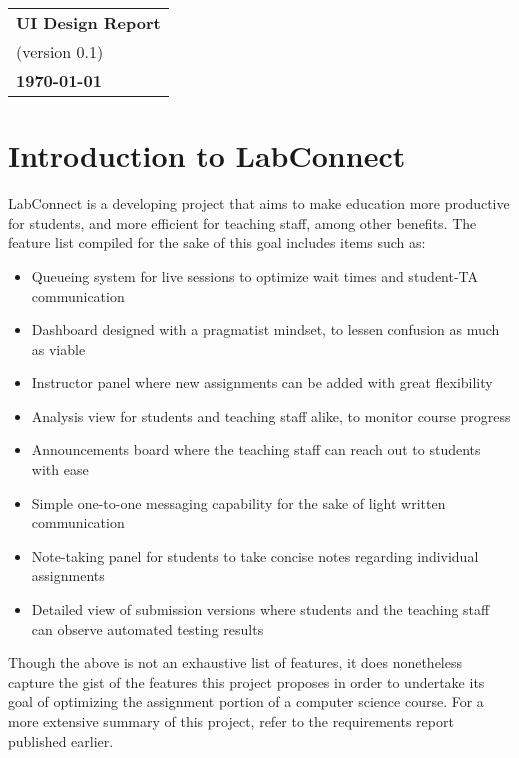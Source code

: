 \documentclass[a4paper, 12pt]{article}
\begin{document}
    \begin{table}[h!]
        \renewcommand{\arraystretch}{1.5}
        \centering
        \begin{tabular}{ |>{\centering\arraybackslash}m{15.15cm}| }
            \hline
            \Large \textbf{UI Design Report} \\
            \small (version 0.1) \\
            \small \textbf{\today} \\
            \hline
        \end{tabular}
    \end{table}
    
    
    \section{Introduction to LabConnect}
    
    LabConnect is a developing project that aims to make education more productive for students,
    and more efficient for teaching staff, among other benefits. The feature list compiled for the
    sake of this goal includes items such as:
    \begin{itemize}
        \item Queueing system for live sessions to optimize wait times and student-TA communication
        \item Dashboard designed with a pragmatist mindset, to lessen confusion as much as viable
        \item Instructor panel where new assignments can be added with great flexibility
        \item Analysis view for students and teaching staff alike, to monitor course progress
        \item Announcements board where the teaching staff can reach out to students with ease
        \item Simple one-to-one messaging capability for the sake of light written communication
        \item Note-taking panel for students to take concise notes regarding individual assignments
        \item Detailed view of submission versions where students and the teaching staff can observe
            automated testing results
    \end{itemize}
    
    Though the above is not an exhaustive list of features, it does nonetheless capture the gist of the features
    this project proposes in order to undertake its goal of optimizing the assignment portion of
    a computer science course. For a more extensive summary of this project, refer to the requirements report published earlier.
    
\end{document}
